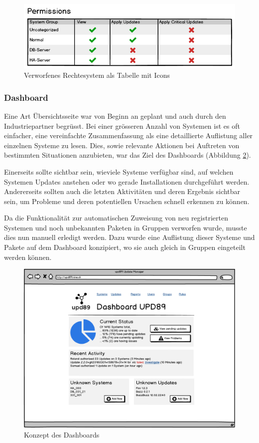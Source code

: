 \begin{figure}[H]
	\centering
	\includegraphics[width=0.75\linewidth]{files/mockups/permission_2}
	\caption{Verworfenes Rechtesystem als Tabelle mit Icons}
	\label{fig:design:permission_2}
\end{figure}

\subsubsection*{Dashboard}

Eine Art Übersichtsseite war von Beginn an geplant und auch durch den Industriepartner begrüsst. Bei einer grösseren Anzahl von Systemen ist es oft einfacher, eine vereinfachte Zusammenfassung als eine detaillierte Auflistung aller einzelnen Systeme zu lesen. Dies, sowie relevante Aktionen bei Auftreten von bestimmten Situationen anzubieten, war das Ziel des Dashboards (Abbildung \ref{fig:design:dashboard_mockup}).

Einerseits sollte sichtbar sein, wieviele Systeme verfügbar sind, auf welchen Systemen Updates anstehen oder wo gerade Installationen durchgeführt werden. Andererseits sollten auch die letzten Aktivitäten und deren Ergebnis sichtbar sein, um Probleme und deren potentiellen Ursachen schnell erkennen zu können.

Da die Funktionalität zur automatischen Zuweisung von neu registrierten Systemen und noch unbekannten Paketen in Gruppen verworfen wurde, musste dies nun manuell erledigt werden. Dazu wurde eine Auflistung dieser Systeme und Pakete auf dem Dashboard konzipiert, wo sie auch gleich in Gruppen eingeteilt werden können. 

\begin{figure}[H]
	\centering
	\includegraphics[width=\linewidth]{files/mockups/dashboard}
	\caption{Konzept des Dashboards}
	\label{fig:design:dashboard_mockup}
\end{figure}

